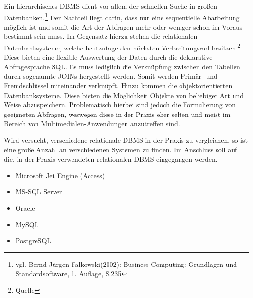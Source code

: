 Ein hierarchisches DBMS dient vor allem der schnellen Suche in großen Datenbanken.\footnote{vgl. Bernd-Jürgen Falkowski(2002): Business Computing: Grundlagen und Standardsoftware, 1. Auflage, S.235}
Der Nachteil liegt darin, dass nur eine sequentielle Abarbeitung möglich ist und somit die Art der Abfragen mehr oder weniger schon im Voraus bestimmt sein muss.
Im Gegensatz hierzu stehen die relationalen Datenbanksysteme, welche heutzutage den höchsten Verbreitungsrad besitzen.\footnote{Quelle}
Diese bieten eine flexible Auswertung der Daten durch die deklarative Abfragesprache SQL.
Es muss lediglich die Verknüpfung zwischen den Tabellen durch sogenannte JOINs hergestellt werden. Somit werden Primär- und Fremdschlüssel miteinander verknüpft.
Hinzu kommen die objektorientierten Datenbanksysteme. Diese bieten die Möglichkeit Objekte von beliebiger Art und Weise abzuspeichern.
Problematisch hierbei sind jedoch die Formulierung von geeigneten Abfragen, weswegen diese in der Praxis eher selten und meist im Bereich von Multimedialen-Anwendungen anzutreffen sind.%

Wird versucht, verschiedene relationale DBMS in der Praxis zu vergleichen, so ist eine große Anzahl an verschiedenen Systemen zu finden.
Im Anschluss soll auf die, in der Praxis verwendeten relationalen DBMS eingegangen werden.

\begin{itemize}
\item Microsoft Jet Engine (Access)
\item MS-SQL Server
\item Oracle
\item MySQL
\item PostgreSQL
\end{itemize}

